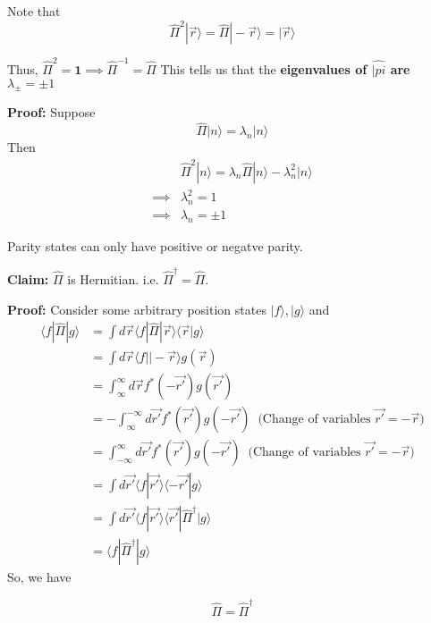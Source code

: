 \documentclass{article}
\newcommand{\ket}[1]{|#1 \rangle}
\newcommand{\inner}[2]{\langle #1 | #2 \rangle}
\begin{document}
\vskip 0.5cm
Note that \[\hat{\Pi}^2 \ket{\vec{r}} = \hat{\Pi} \ket{-\vec{r}} = \ket{\vec{r}}\]

Thus, $\hat{\Pi}^2 = \mathbf{1} \implies \boxed{\hat{\Pi}^{-1} = \hat{\Pi}}$
This tells us that the \textbf{eigenvalues of $\hat{|pi}$ are $\lambda_{\pm} = \pm 1$}

\vskip 0.5cm
\textbf{Proof:} Suppose 
\[ \hat{\Pi} \ket{n} = \lambda_n \ket{n} \]
Then
\begin{align*}
  &\hat{\Pi}^2 \ket{n} = \lambda_n \hat{\Pi} \ket{n} - \lambda_n^2 \ket{n} \\
  \implies& \lambda_n^2 = 1 \\
  \implies& \lambda_n = \pm 1
\end{align*}

Parity states can only have positive or negatve parity.

\begin{dottedbox}

\textbf{Claim:} $\hat{\Pi}$ is Hermitian. i.e. $\hat{\Pi}^{\dagger} = \hat{\Pi}$.

\vskip 0.5cm 
\textbf{Proof:} Consider some arbitrary position states $\ket{f}, \ket{g}$ and
\begin{align*}
  \inner{f}{\hat{\Pi} | g} &= \int d\vec{r} \inner{f}{\hat{\Pi}|\vec{r}}\inner{\vec{r}}{g} \\
  &= \int d\vec{r} \inner{f}{|-\vec{r}} g(\vec{r}) \\
  &= \int_{\infty}^{\infty} d\vec{r} f^{*}(-\vec{r'}) g(\vec{r'}) \\
  &= -\int_{\infty}^{-\infty} d\vec{r'} f^{*}(\vec{r'})g(-\vec{r'})\;\;\text{(Change of variables $\vec{r'} = -\vec{r}$)} \\
  &= \int_{-\infty}^{\infty} d\vec{r'} f^{*}(\vec{r'})g(-\vec{r'})\;\;\text{(Change of variables $\vec{r'} = -\vec{r}$)} \\
  &= \int d\vec{r'} \inner{f}{\vec{r'}} \inner{-\vec{r'}}{g} \\
  &= \int d\vec{r'} \inner{f}{\vec{r'}} \inner{\vec{r'}|\hat{\Pi}^{\dagger}}{g} \\
  &= \inner{f|\hat{\Pi}^{\dagger}}{g}
\end{align*}
So, we have 

\[ \boxed{\hat{\Pi} = \hat{\Pi}^{\dagger}} \]
\end{dottedbox}
\end{document}
